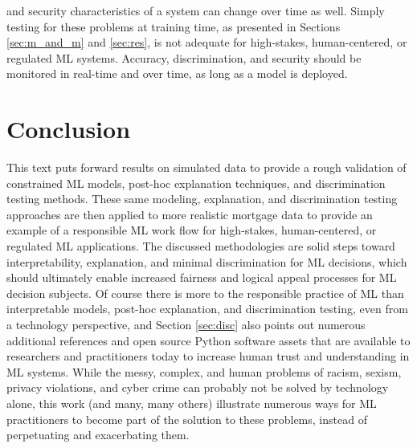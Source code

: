 \documentclass[information,article,submit,moreauthors,pdftex]{definitions/mdpi}
\begin{document}
{and security characteristics of a system can change over time as well. Simply testing for these problems at training time, as presented in Sections \ref{sec:m_and_m} and \ref{sec:res}, is not adequate for high-stakes, human-centered, or regulated ML systems. Accuracy, discrimination, and security should be monitored in real-time and over time, as long as a model is deployed.

\section{Conclusion}\label{sec:con}

This text puts forward results on simulated data to provide a rough validation of constrained ML models, post-hoc explanation techniques, and discrimination testing methods. These same modeling, explanation, and discrimination testing approaches are then applied to more realistic mortgage data to provide an example of a responsible ML work flow for high-stakes, human-centered, or regulated ML applications. The discussed methodologies are solid steps toward interpretability, explanation, and minimal discrimination for ML decisions, which should ultimately enable increased fairness and logical appeal processes for ML decision subjects. Of course there is more to the responsible practice of ML than interpretable models, post-hoc explanation, and discrimination testing, even from a technology perspective, and Section \ref{sec:disc} also points out numerous additional references and open source Python software assets that are available to researchers and practitioners today to increase human trust and understanding in ML systems. While the messy, complex, and human problems of racism, sexism, privacy violations, and cyber crime can probably not be solved by technology alone, this work (and many, many others) illustrate numerous ways for ML practitioners to become part of the solution to these problems, instead of perpetuating and exacerbating them. 

\vspace{6pt} 


}
\end{document}

